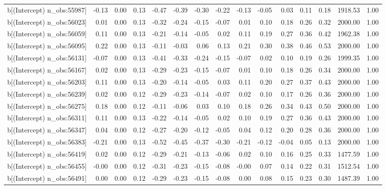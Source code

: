 \begin{table}[ht]
\begin{tabular}{rrrrrrrrrrrrrrr}
  b[(Intercept) n\_obs:55987] & -0.13 & 0.00 & 0.13 & -0.47 & -0.39 & -0.30 & -0.22 & -0.13 & -0.05 & 0.03 & 0.11 & 0.18 & 1918.53 & 1.00 \\ 
  b[(Intercept) n\_obs:56023] & 0.01 & 0.00 & 0.13 & -0.32 & -0.24 & -0.15 & -0.07 & 0.01 & 0.10 & 0.18 & 0.26 & 0.32 & 2000.00 & 1.00 \\ 
  b[(Intercept) n\_obs:56059] & 0.11 & 0.00 & 0.13 & -0.21 & -0.14 & -0.05 & 0.02 & 0.11 & 0.19 & 0.27 & 0.36 & 0.42 & 1962.38 & 1.00 \\ 
  b[(Intercept) n\_obs:56095] & 0.22 & 0.00 & 0.13 & -0.11 & -0.03 & 0.06 & 0.13 & 0.21 & 0.30 & 0.38 & 0.46 & 0.53 & 2000.00 & 1.00 \\ 
  b[(Intercept) n\_obs:56131] & -0.07 & 0.00 & 0.13 & -0.41 & -0.33 & -0.24 & -0.15 & -0.07 & 0.02 & 0.10 & 0.19 & 0.26 & 1999.35 & 1.00 \\ 
  b[(Intercept) n\_obs:56167] & 0.02 & 0.00 & 0.13 & -0.29 & -0.23 & -0.15 & -0.07 & 0.01 & 0.10 & 0.18 & 0.26 & 0.34 & 2000.00 & 1.00 \\ 
  b[(Intercept) n\_obs:56203] & 0.11 & 0.00 & 0.13 & -0.20 & -0.14 & -0.05 & 0.03 & 0.11 & 0.20 & 0.27 & 0.37 & 0.43 & 2000.00 & 1.00 \\ 
  b[(Intercept) n\_obs:56239] & 0.02 & 0.00 & 0.12 & -0.29 & -0.23 & -0.14 & -0.07 & 0.02 & 0.10 & 0.17 & 0.26 & 0.36 & 2000.00 & 1.00 \\ 
  b[(Intercept) n\_obs:56275] & 0.18 & 0.00 & 0.12 & -0.11 & -0.06 & 0.03 & 0.10 & 0.18 & 0.26 & 0.34 & 0.43 & 0.50 & 2000.00 & 1.00 \\ 
  b[(Intercept) n\_obs:56311] & 0.11 & 0.00 & 0.13 & -0.22 & -0.14 & -0.05 & 0.02 & 0.10 & 0.19 & 0.27 & 0.36 & 0.43 & 2000.00 & 1.00 \\ 
  b[(Intercept) n\_obs:56347] & 0.04 & 0.00 & 0.12 & -0.27 & -0.20 & -0.12 & -0.05 & 0.04 & 0.12 & 0.20 & 0.28 & 0.36 & 2000.00 & 1.00 \\ 
  b[(Intercept) n\_obs:56383] & -0.21 & 0.00 & 0.13 & -0.52 & -0.45 & -0.37 & -0.30 & -0.21 & -0.12 & -0.04 & 0.05 & 0.13 & 2000.00 & 1.00 \\ 
  b[(Intercept) n\_obs:56419] & 0.02 & 0.00 & 0.12 & -0.29 & -0.21 & -0.13 & -0.06 & 0.02 & 0.10 & 0.16 & 0.25 & 0.33 & 1477.59 & 1.00 \\ 
  b[(Intercept) n\_obs:56455] & -0.00 & 0.00 & 0.12 & -0.31 & -0.23 & -0.15 & -0.08 & -0.00 & 0.07 & 0.14 & 0.22 & 0.31 & 1512.54 & 1.00 \\ 
  b[(Intercept) n\_obs:56491] & 0.00 & 0.00 & 0.12 & -0.29 & -0.23 & -0.15 & -0.08 & 0.00 & 0.08 & 0.15 & 0.23 & 0.30 & 1487.39 & 1.00 \\ 

\end{tabular}
\end{table}
